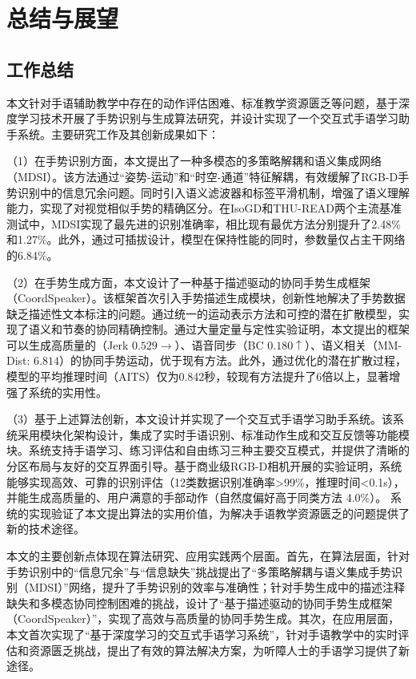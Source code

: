 
\chapter{总结与展望}
\label{sec:summary}

\section{工作总结}
本文针对手语辅助教学中存在的动作评估困难、标准教学资源匮乏等问题，基于深度学习技术开展了手势识别与生成算法研究，并设计实现了一个交互式手语学习助手系统。主要研究工作及其创新成果如下：

（1）在手势识别方面，本文提出了一种多模态的多策略解耦和语义集成网络（MDSI）。该方法通过“姿势-运动”和“时空-通道”特征解耦，有效缓解了RGB-D手势识别中的信息冗余问题。同时引入语义滤波器和标签平滑机制，增强了语义理解能力，实现了对视觉相似手势的精确区分。在IsoGD和THU-READ两个主流基准测试中，MDSI实现了最先进的识别准确率，相比现有最优方法分别提升了2.48\%和1.27\%。此外，通过可插拔设计，模型在保持性能的同时，参数量仅占主干网络的6.84\%。

（2）在手势生成方面，本文设计了一种基于描述驱动的协同手势生成框架（CoordSpeaker）。该框架首次引入手势描述生成模块，创新性地解决了手势数据缺乏描述性文本标注的问题。通过统一的运动表示方法和可控的潜在扩散模型，实现了语义和节奏的协同精确控制。通过大量定量与定性实验证明，本文提出的框架可以生成高质量的（Jerk $0.529\rightarrow$）、语音同步（BC $0.180\uparrow$）、语义相关（MM-Dist: $6.814$）的协同手势运动，优于现有方法。此外，通过优化的潜在扩散过程，模型的平均推理时间（AITS）仅为0.842秒，较现有方法提升了6倍以上，显著增强了系统的实用性。

（3）基于上述算法创新，本文设计并实现了一个交互式手语学习助手系统。该系统采用模块化架构设计，集成了实时手语识别、标准动作生成和交互反馈等功能模块。系统支持手语学习、练习评估和自由练习三种主要交互模式，并提供了清晰的分区布局与友好的交互界面引导。基于商业级RGB-D相机开展的实验证明，系统能够实现高效、可靠的识别评估（12类数据识别准确率\textgreater 99\%，推理时间\textless 0.1s），并能生成高质量的、用户满意的手部动作（自然度偏好高于同类方法 4.0\%）。
系统的实现验证了本文提出算法的实用价值，为解决手语教学资源匮乏的问题提供了新的技术途径。

本文的主要创新点体现在算法研究、应用实践两个层面。首先，在算法层面，针对手势识别中的“信息冗余”与“信息缺失”挑战提出了“多策略解耦与语义集成手势识别（MDSI）”网络，提升了手势识别的效率与准确性；针对手势生成中的描述注释缺失和多模态协同控制困难的挑战，设计了“基于描述驱动的协同手势生成框架（CoordSpeaker）”，实现了高效与高质量的协同手势生成。其次，在应用层面，本文首次实现了“基于深度学习的交互式手语学习系统”，针对手语教学中的实时评估和资源匮乏挑战，提出了有效的算法解决方案，为听障人士的手语学习提供了新途径。

